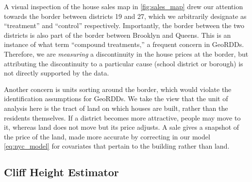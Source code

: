 A visual inspection of the house sales map in \autoref{fig:sales_map} drew our attention towards the border between districts 19 and 27, which we arbitrarily designate as ``treatment'' and ``control'' respectively.
Importantly, the border between the two districts is also part of the border between Brooklyn and Queens.
This is an instance of what \cite{keele_titiunik_2015} term ``compound treatments,'' a frequent concern in GeoRDDs.
Therefore, we are \emph{measuring} a discontinuity in the house prices at the border,
but attributing the discontinuity to a particular cause (school district or borough) is not directly supported by the data.

Another concern is units sorting around the border, which would violate the identification assumptions for GeoRDDs.
We take the view that the unit of analysis here is the tract of land on which houses are built, rather than the residents themselves.
If a district becomes more attractive, people may move to it, whereas land does not move but its price adjusts.
A sale gives a snapshot of the price of the land, made more accurate by correcting in our model \autoref{eq:nyc_model} for covariates that pertain to the building rather than land.



\subsection{Cliff Height Estimator}

